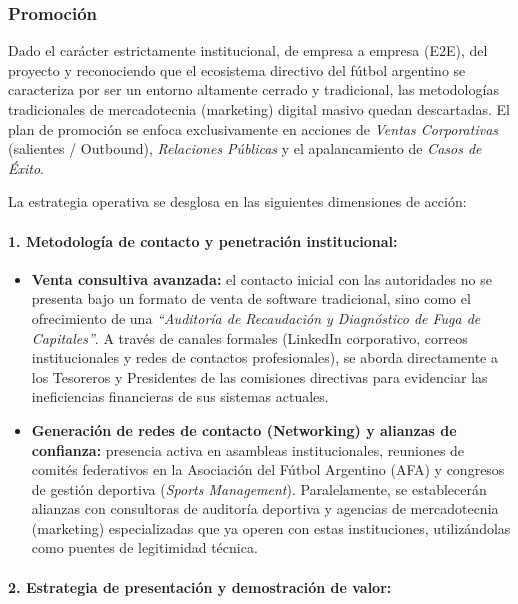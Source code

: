 \newpage

\subsubsection*{Promoción}

Dado el carácter estrictamente institucional, de empresa a empresa (E2E), del proyecto y reconociendo que el ecosistema directivo del fútbol argentino se caracteriza por ser un entorno altamente cerrado y tradicional, las metodologías tradicionales de mercadotecnia (marketing) digital masivo quedan descartadas. El plan de promoción se enfoca exclusivamente en acciones de \textit{Ventas Corporativas} (salientes / Outbound), \textit{Relaciones Públicas} y el apalancamiento de \textit{Casos de Éxito}.

La estrategia operativa se desglosa en las siguientes dimensiones de acción:

\paragraph{1. Metodología de contacto y penetración institucional:}

\begin{itemize}
    \item \textbf{Venta consultiva avanzada:} el contacto inicial con las autoridades no se presenta bajo un formato de venta de software tradicional, sino como el ofrecimiento de una \textit{``Auditoría de Recaudación y Diagnóstico de Fuga de Capitales''}. A través de canales formales (LinkedIn corporativo, correos institucionales y redes de contactos profesionales), se aborda directamente a los Tesoreros y Presidentes de las comisiones directivas para evidenciar las ineficiencias financieras de sus sistemas actuales.
    \item \textbf{Generación de redes de contacto (Networking) y alianzas de confianza:} presencia activa en asambleas institucionales, reuniones de comités federativos en la Asociación del Fútbol Argentino (AFA) y congresos de gestión deportiva (\textit{Sports Management}). Paralelamente, se establecerán alianzas con consultoras de auditoría deportiva y agencias de mercadotecnia (marketing) especializadas que ya operen con estas instituciones, utilizándolas como puentes de legitimidad técnica.
\end{itemize}

\paragraph{2. Estrategia de presentación y demostración de valor:}

